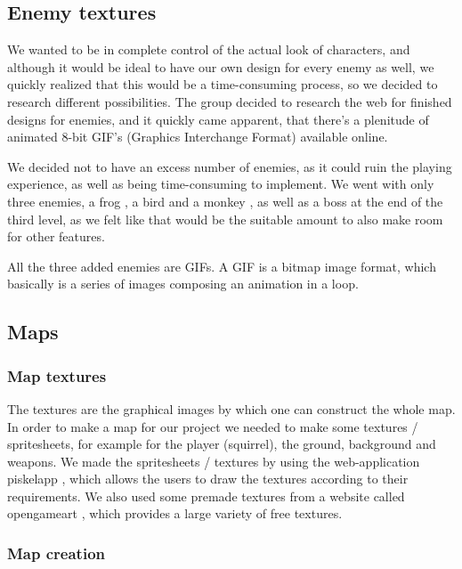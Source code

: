 \documentclass[12p]{article}
\begin{document}
\newpage 
\subsection{Enemy textures}
We wanted to be in complete control of the actual look of characters, and although it would be ideal to have our own design for every enemy as well, we quickly realized that this would be a time-consuming process, so we decided to research different possibilities. The group decided to research the web for finished designs for enemies, and it quickly came apparent, that there’s a plenitude of animated 8-bit GIF’s (Graphics Interchange Format) available online. 

We decided not to have an excess number of enemies, as it could ruin the playing experience, as well as being time-consuming to implement. We went with only three enemies, a frog \cite{FrogEnemyDesign}, a bird \cite{BirdEnemyDesign} and a monkey \cite{MonkeyEnemyDesign}, as well as a boss \cite{BossEnemyDesign} at the end of the third level, as we felt like that would be the suitable amount to also make room for other features. 

All the three added enemies are GIFs. A GIF is a bitmap image format, which basically is a series of images composing an animation in a loop.

\subsection{Maps} \label{VisualDocMaps}

\subsubsection{Map textures}

The textures are the graphical images by which one can construct the whole map. In order to make a map for our project we needed to make some textures / spritesheets, for example for the player (squirrel), the ground, background and weapons. We made the spritesheets / textures by using the web-application piskelapp \cite{piskelapp}, which allows the users to draw the textures according to their requirements. We also used some premade textures from a website called opengameart \cite{opengameart}, which provides a large variety of free textures.


\subsubsection{Map creation}
\end{document}

